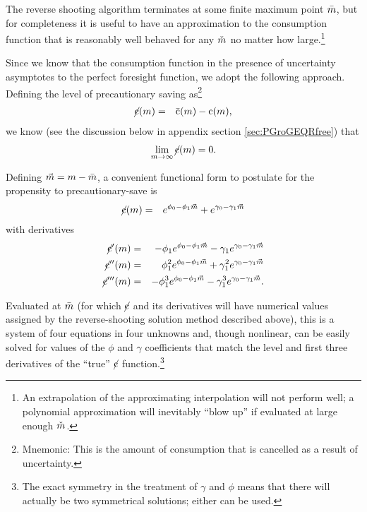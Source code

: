 \documentclass{handout}
\begin{document}
The reverse shooting algorithm terminates at some finite maximum point $\bar{m}$, but for completeness 
it is useful to have an approximation to the consumption function that is reasonably well behaved
for any $\mTarg^{\null}$ no matter how large.\footnote{An extrapolation of the approximating interpolation will 
not perform well; a polynomial approximation will inevitably ``blow up'' if evaluated at large enough $\mTarg^{\null}$.}

Since we know that the consumption function in the presence of uncertainty asymptotes to the 
perfect foresight function, we adopt the following approach.  Defining the level of precautionary
saving as\footnote{Mnemonic: This is the amount of consumption that is cancelled as a result of uncertainty.}
\newcommand{\psav}{\cancel{c}}
\newcommand{\psavFunc}{\ensuremath{\cancel{\cFunc}}}
\begin{eqnarray}
  \label{eq:pSavFunc}
  \psavFunc(\mRat) & = & \bar{\cFunc}(\mRat)-\cFunc(\mRat),
\end{eqnarray}
we know (see the discussion below in appendix section \ref{sec:PGroGEQRfree}) that 
\begin{eqnarray}
  \lim_{\mRat \rightarrow \infty} \psavFunc(\mRat) = 0
.
\end{eqnarray}

Defining $\vec{m}=m-\bar{m}$, a convenient functional form to postulate for the
propensity to precautionary-save is
\begin{eqnarray}
  \psavFunc(\mRat) & = & e^{\phi_{0}-\phi_{1} \vec{\mRat}}+e^{\gamma_{0}-\gamma_{1} \vec{\mRat}}
\end{eqnarray}
with derivatives
\begin{eqnarray}
    \psavFunc^{\prime}(\mRat) & = & -\phi_{1} e^{\phi_{0}-\phi_{1} \vec{\mRat}} - \gamma_{1} e^{\gamma_{0}-\gamma_{1} \vec{\mRat}}
\\  \psavFunc^{\prime\prime}(\mRat) & = & \phantom{-}\phi_{1}^{2} e^{\phi_{0}-\phi_{1} \vec{\mRat}} + \gamma_{1}^{2} e^{\gamma_{0}-\gamma_{1} \vec{\mRat}}
\\  \psavFunc^{\prime\prime\prime}(\mRat) & = & -\phi_{1}^{3} e^{\phi_{0}-\phi_{1} \vec{\mRat}} - \gamma_{1}^{3} e^{\gamma_{0}-\gamma_{1} \vec{\mRat}}
.
\end{eqnarray}

Evaluated at $\bar{m}$ (for which $\psavFunc$ and its derivatives will have numerical values
assigned by the reverse-shooting solution method described above), this is a system of four equations in four unknowns and, though nonlinear, can be easily solved for 
values of the $\phi$ and $\gamma$ coefficients that match the level and first three derivatives
of the ``true'' $\psavFunc$ function.\footnote{The exact symmetry in
  the treatment of $\gamma$ and $\phi$ means that there will actually
  be two symmetrical solutions; either can be used.}
\end{document}

